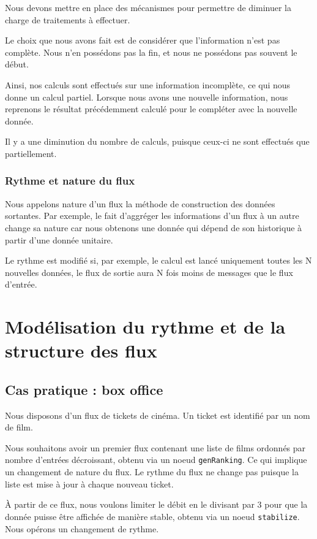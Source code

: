 \documentclass{llncs}
\begin{document}
Nous devons mettre en place des mécanismes pour permettre de diminuer la charge
de traitements à effectuer.

Le choix que nous avons fait est de considérer que l'information n'est pas complète.
Nous n'en possédons pas la fin, et nous ne possédons pas souvent le début.

Ainsi, nos calculs sont effectués sur une information incomplète, ce qui nous
donne un calcul partiel.
Lorsque nous avons une nouvelle information, nous reprenons le résultat
précédemment calculé pour le compléter avec la nouvelle donnée.

Il y a une diminution du nombre de calculs, puisque ceux-ci ne sont effectués
que partiellement.

\subsubsection{Rythme et nature du flux}
Nous appelons nature d'un flux la méthode de construction des données sortantes.
Par exemple, le fait d'aggréger les informations d'un flux à un autre change
sa nature car nous obtenons une donnée qui dépend de son historique
à partir d'une donnée unitaire.

Le rythme est modifié si, par exemple, le calcul est lancé uniquement toutes les
N nouvelles données, le flux de sortie aura N fois moins de messages que le flux d'entrée.

\section{Modélisation du rythme et de la structure des flux}
\subsection{Cas pratique : box office}
Nous disposons d'un flux de tickets de cinéma.
Un ticket est identifié par un nom de film.

Nous souhaitons avoir un premier flux contenant une liste de films ordonnés par
nombre d'entrées décroissant, obtenu via un noeud \lstinline{genRanking}.
Ce qui implique un changement de nature du flux.
Le rythme du flux ne change pas puisque la liste est mise à jour à chaque nouveau
ticket.

À partir de ce flux, nous voulons limiter le débit en le divisant par 3 pour
que la donnée puisse être affichée de manière stable, obtenu via un noeud \lstinline{stabilize}.
Nous opérons un changement de rythme.
\end{document}
